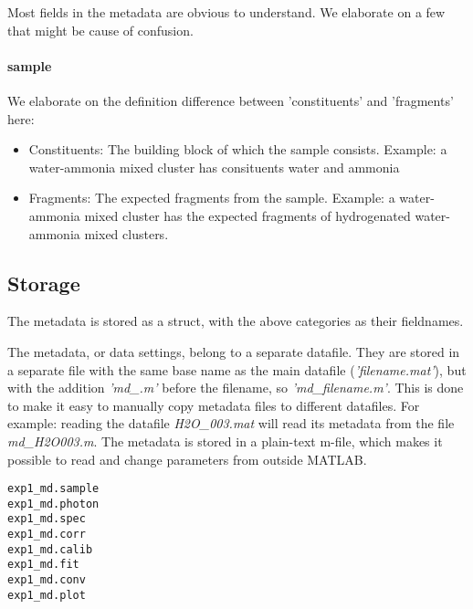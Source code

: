 Most fields in the metadata are obvious to understand. We elaborate on a few that might be cause of confusion.

\paragraph{sample}
 We elaborate on the definition difference between 'constituents' and 'fragments' here:
\begin{itemize}
\item Constituents: The building block of which the sample consists. Example: a water-ammonia mixed cluster has consituents water and ammonia
\item Fragments: The expected fragments from the sample. Example: a water-ammonia mixed cluster has the expected fragments of hydrogenated water-ammonia mixed clusters.
\end{itemize}


\subsection {Storage}
The metadata is stored as a struct, with the above categories as their fieldnames. 

The metadata, or data settings, belong to a separate datafile. They are stored in a separate file with the same base name as the main datafile (\emph{'filename.mat'}), but with the addition \emph{'md\_.m'} before the filename, so \emph{'md\_filename.m'}. This is done to make it easy to manually copy metadata files to different datafiles. For example: reading the datafile \emph{H2O\_003.mat} will read its metadata from the file \emph{md\_H2O003.m}. The metadata is stored in a plain-text m-file, which makes it possible to read and change parameters from outside MATLAB.

\lstset{language=MATLAB}
\begin{lstlisting}
exp1_md.sample
exp1_md.photon
exp1_md.spec
exp1_md.corr
exp1_md.calib
exp1_md.fit
exp1_md.conv
exp1_md.plot
\end{lstlisting}
